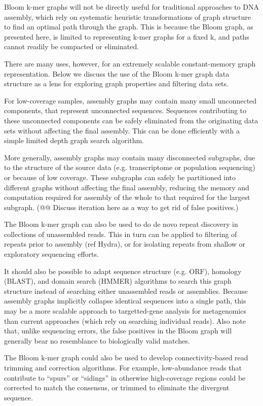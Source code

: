 \documentclass[12pt]{article} \usepackage{simplemargins}
\begin{document}
Bloom k-mer graphs will not be directly useful for traditional
approaches to DNA assembly, which rely on systematic heuristic
transformations of graph structure to find an optimal path through the
graph.  This is because the Bloom graph, as presented here, is limited
to representing k-mer graphs for a fixed k, and paths cannot readily
be compacted or eliminated.

There are many uses, however, for an extremely scalable
constant-memory graph representation.  Below we discuss the use of the
Bloom k-mer graph data structure as a lens for exploring graph
properties and filtering data sets.

For low-coverage samples, assembly graphs may contain many small
unconnected components, that represent unconnected sequences.
Sequences contributing to these unconnected components can be safely
eliminated from the originating data sets without affecting the final
assembly.  This can be done efficiently with a simple limited depth
graph search algorithm.

More generally, assembly graphs may contain many disconnected
subgraphs, due to the structure of the source data (e.g. transcriptome
or population sequencing) or because of low coverage.  These subgraphs
can safely be partitioned into different graphs without affecting the
final assembly, reducing the memory and computation required for
assembly of the whole to that required for the largest subgraph.
(@@ Discuss iteration here as a way to get rid of false positives.)

The Bloom k-mer graph can also be used to do de novo repeat discovery
in collections of unassembled reads.  This in turn can be applied to
filtering of repeats prior to assembly (ref Hydra), or for isolating
repeats from shallow or exploratory sequencing efforts.

It should also be possible to adapt sequence structure (e.g. ORF),
homology (BLAST), and domain search (HMMER) algorithms to search this
graph structure instead of searching either unassembled reads or
assemblies.  Because assembly graphs implicitly collapse identical
sequences into a single path, this may be a more scalable approach to
targetted-gene analysis for metagenomics than current approaches
(which rely on searching individual reads).  Also note that, unlike
sequencing errors, the false positives in the Bloom graph will
generally bear no resemblance to biologically valid matches.

The Bloom k-mer graph could also be used to develop connectivity-based
read trimming and correction algorithms.  For example, low-abundance
reads that contribute to ``spurs'' or ``sidings'' in otherwise
high-coverage regions could be corrected to match the
consensus, or trimmed to eliminate the divergent sequence.
\end{document}

